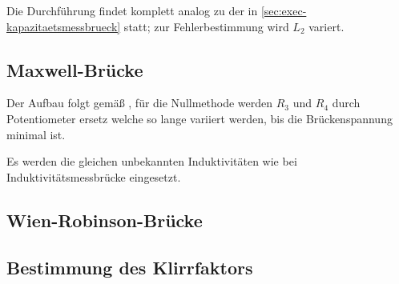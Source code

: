 Die Durchführung findet komplett analog zu der in \autoref{sec:exec-kapazitaetsmessbrueck} statt; zur
Fehlerbestimmung wird $L_2$ variert.

\subsection{Maxwell-Brücke}
\label{sec:exec-maxwell-bruecke}

Der Aufbau folgt gemäß \label{fig:maxwell-schaltplan}, für die Nullmethode werden $R_3$ und 
$R_4$ durch Potentiometer ersetz welche so lange variiert werden, bis die Brückenspannung 
minimal ist.

Es werden die gleichen unbekannten Induktivitäten wie bei Induktivitätsmessbrücke 
eingesetzt.

\subsection{Wien-Robinson-Brücke}
\label{sec:exec-wien-robinson-bruecke}

\subsection{Bestimmung des Klirrfaktors}
\label{sec:exec-klirrfaktors}
